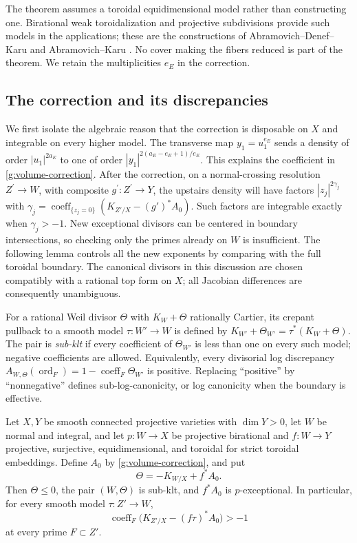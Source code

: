 The theorem assumes a toroidal equidimensional model rather than
constructing one.  Birational weak toroidalization and projective
subdivisions provide such models in the applications; these are the
constructions of Abramovich--Denef--Karu and Abramovich--Karu
\cite{ADK2013,AK2000}.  No cover making the fibers reduced is part of
the theorem.  We retain the multiplicities $e_E$ in the correction.

\subsection{The correction and its discrepancies}

We first isolate the algebraic reason that the correction is disposable
on $X$ and integrable on every higher model.  The transverse map $y_1=u_1^{e_E}$ sends a density of order
$|u_1|^{2a_E}$ to one of order
$|y_1|^{2(a_E-e_E+1)/e_E}$. This explains the coefficient in
\eqref{g:volume-correction}. After the correction, on a normal-crossing
resolution $Z^\prime\to W$, with composite $g^\prime:Z^\prime\to Y$,
the upstairs density will have factors
$|z_j|^{2\gamma_j}$ with
$\gamma_j=\operatorname{coeff}_{\{z_j=0\}}
(K_{Z'/X}-(g')^*A_0)$. Such factors are integrable exactly when
$\gamma_j>-1$. New exceptional divisors can be centered in boundary
intersections, so checking only the primes already on $W$ is insufficient.
The following lemma controls all the new exponents by comparing with the
full toroidal boundary. The canonical divisors in
this discussion are chosen compatibly with a rational top form on
$X$; all Jacobian differences are consequently unambiguous.

For a rational Weil divisor $\Theta$ with $K_W+\Theta$ rationally
Cartier, its crepant pullback to a smooth model $\tau:W'\to W$ is
defined by $K_{W'}+\Theta_{W'}=\tau^*(K_W+\Theta)$.
The pair is \emph{sub-klt} if every coefficient of $\Theta_{W'}$
is less than one on every such model; negative coefficients are
allowed.  Equivalently, every divisorial log discrepancy
$A_{W,\Theta}(\operatorname{ord}_F)=1-\operatorname{coeff}_F\Theta_{W'}$
is positive.  Replacing ``positive'' by ``nonnegative'' defines
sub-log-canonicity, or log canonicity when the boundary is effective.

\begin{lemma}\label{g:volume-subklt}
Let $X,Y$ be smooth connected projective varieties with $\dim Y>0$,
let $W$ be normal and integral, and let $p:W\to X$ be projective
birational and $f:W\to Y$ projective, surjective, equidimensional,
and toroidal for strict toroidal embeddings. Define $A_0$ by
\eqref{g:volume-correction}, and put
\[
 \Theta=-K_{W/X}+f^*A_0.
\]
Then $\Theta\leq0$, the pair $(W,\Theta)$ is sub-klt, and
$f^*A_0$ is $p$-exceptional.  In particular, for every smooth model
$\tau:Z'\to W$,
\begin{equation}\label{g:volume-all-valuations}
 \operatorname{coeff}_F\bigl(K_{Z'/X}-(f\tau)^*A_0\bigr)>-1
\end{equation}
at every prime $F\subset Z'$.
\end{lemma}


